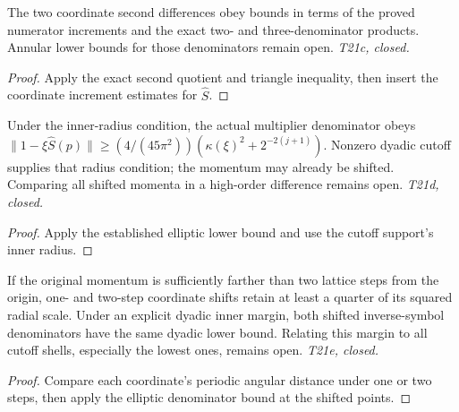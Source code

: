 \begin{lemma}
  \label{lem:symbol-diff-reciprocal-two-bound}
  \leanok
  The two coordinate second differences obey bounds in terms of the proved
  numerator increments and the exact two- and three-denominator products.
  Annular lower bounds for those denominators remain open.
  \emph{T21c, closed.}
\end{lemma}
\begin{proof}\leanok
  Apply the exact second quotient and triangle inequality, then insert the
  coordinate increment estimates for $\widehat S$.
\end{proof}

\begin{lemma}
  \label{lem:symbol-denom-annulus}
  \leanok
  Under the inner-radius condition, the actual multiplier denominator obeys
  $\|1-\xi\widehat S(p)\|\ge
  (4/(45\pi^2))(\kappa(\xi)^2+2^{-2(j+1)})$.
  Nonzero dyadic cutoff supplies that radius condition; the momentum may
  already be shifted. Comparing all shifted momenta in a high-order
  difference remains open. \emph{T21d, closed.}
\end{lemma}
\begin{proof}\leanok
  Apply the established elliptic lower bound and use the cutoff support's
  inner radius.
\end{proof}

\begin{lemma}
  \label{lem:symbol-shift-annulus}
  \leanok
  If the original momentum is sufficiently farther than two lattice steps
  from the origin, one- and two-step coordinate shifts retain at least a
  quarter of its squared radial scale. Under an explicit dyadic inner margin,
  both shifted inverse-symbol denominators have the same dyadic lower bound.
  Relating this margin to all cutoff shells, especially the lowest ones,
  remains open. \emph{T21e, closed.}
\end{lemma}
\begin{proof}\leanok
  Compare each coordinate's periodic angular distance under one or two steps,
  then apply the elliptic denominator bound at the shifted points.
\end{proof}

